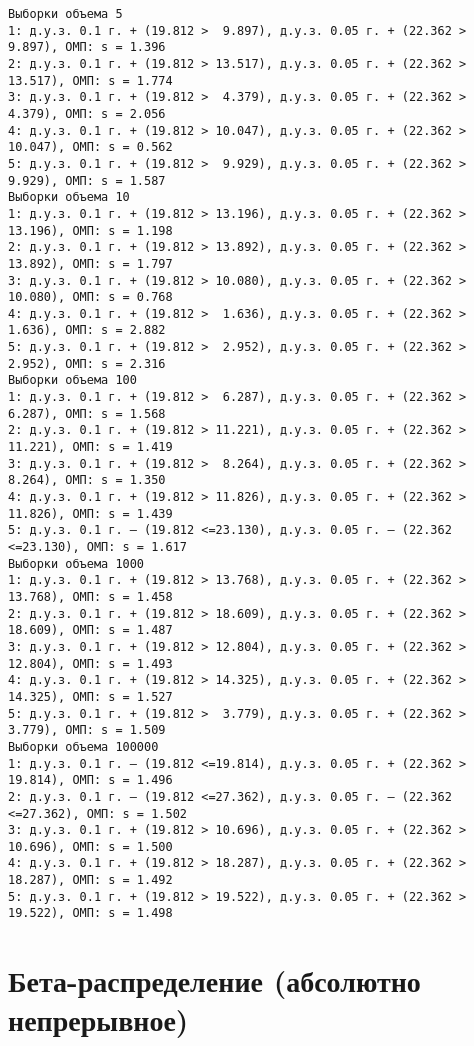 \documentclass[11pt]{article}
\begin{document}
{\fontsize{8.8}{9}
    \begin{Verbatim}[commandchars=\\\{\}]
Выборки объема 5
1: д.у.з. 0.1 г. + (19.812 >  9.897), д.у.з. 0.05 г. + (22.362 >  9.897), ОМП: s = 1.396
2: д.у.з. 0.1 г. + (19.812 > 13.517), д.у.з. 0.05 г. + (22.362 > 13.517), ОМП: s = 1.774
3: д.у.з. 0.1 г. + (19.812 >  4.379), д.у.з. 0.05 г. + (22.362 >  4.379), ОМП: s = 2.056
4: д.у.з. 0.1 г. + (19.812 > 10.047), д.у.з. 0.05 г. + (22.362 > 10.047), ОМП: s = 0.562
5: д.у.з. 0.1 г. + (19.812 >  9.929), д.у.з. 0.05 г. + (22.362 >  9.929), ОМП: s = 1.587
Выборки объема 10
1: д.у.з. 0.1 г. + (19.812 > 13.196), д.у.з. 0.05 г. + (22.362 > 13.196), ОМП: s = 1.198
2: д.у.з. 0.1 г. + (19.812 > 13.892), д.у.з. 0.05 г. + (22.362 > 13.892), ОМП: s = 1.797
3: д.у.з. 0.1 г. + (19.812 > 10.080), д.у.з. 0.05 г. + (22.362 > 10.080), ОМП: s = 0.768
4: д.у.з. 0.1 г. + (19.812 >  1.636), д.у.з. 0.05 г. + (22.362 >  1.636), ОМП: s = 2.882
5: д.у.з. 0.1 г. + (19.812 >  2.952), д.у.з. 0.05 г. + (22.362 >  2.952), ОМП: s = 2.316
Выборки объема 100
1: д.у.з. 0.1 г. + (19.812 >  6.287), д.у.з. 0.05 г. + (22.362 >  6.287), ОМП: s = 1.568
2: д.у.з. 0.1 г. + (19.812 > 11.221), д.у.з. 0.05 г. + (22.362 > 11.221), ОМП: s = 1.419
3: д.у.з. 0.1 г. + (19.812 >  8.264), д.у.з. 0.05 г. + (22.362 >  8.264), ОМП: s = 1.350
4: д.у.з. 0.1 г. + (19.812 > 11.826), д.у.з. 0.05 г. + (22.362 > 11.826), ОМП: s = 1.439
5: д.у.з. 0.1 г. – (19.812 <=23.130), д.у.з. 0.05 г. – (22.362 <=23.130), ОМП: s = 1.617
Выборки объема 1000
1: д.у.з. 0.1 г. + (19.812 > 13.768), д.у.з. 0.05 г. + (22.362 > 13.768), ОМП: s = 1.458
2: д.у.з. 0.1 г. + (19.812 > 18.609), д.у.з. 0.05 г. + (22.362 > 18.609), ОМП: s = 1.487
3: д.у.з. 0.1 г. + (19.812 > 12.804), д.у.з. 0.05 г. + (22.362 > 12.804), ОМП: s = 1.493
4: д.у.з. 0.1 г. + (19.812 > 14.325), д.у.з. 0.05 г. + (22.362 > 14.325), ОМП: s = 1.527
5: д.у.з. 0.1 г. + (19.812 >  3.779), д.у.з. 0.05 г. + (22.362 >  3.779), ОМП: s = 1.509
Выборки объема 100000
1: д.у.з. 0.1 г. – (19.812 <=19.814), д.у.з. 0.05 г. + (22.362 > 19.814), ОМП: s = 1.496
2: д.у.з. 0.1 г. – (19.812 <=27.362), д.у.з. 0.05 г. – (22.362 <=27.362), ОМП: s = 1.502
3: д.у.з. 0.1 г. + (19.812 > 10.696), д.у.з. 0.05 г. + (22.362 > 10.696), ОМП: s = 1.500
4: д.у.з. 0.1 г. + (19.812 > 18.287), д.у.з. 0.05 г. + (22.362 > 18.287), ОМП: s = 1.492
5: д.у.з. 0.1 г. + (19.812 > 19.522), д.у.з. 0.05 г. + (22.362 > 19.522), ОМП: s = 1.498
\end{Verbatim}
}

\newpage
\vspace{-0.5cm}
    \hypertarget{ux431ux435ux442ux430-ux440ux430ux441ux43fux440ux435ux434ux435ux43bux435ux43dux438ux435-ux430ux431ux441ux43eux43bux44eux442ux43dux43e-ux43dux435ux43fux440ux435ux440ux44bux432ux43dux43eux435}{%
\section*{Бета-распределение (абсолютно
непрерывное)}\label{ux431ux435ux442ux430-ux440ux430ux441ux43fux440ux435ux434ux435ux43bux435ux43dux438ux435-ux430ux431ux441ux43eux43bux44eux442ux43dux43e-ux43dux435ux43fux440ux435ux440ux44bux432ux43dux43eux435}}
\end{document}
